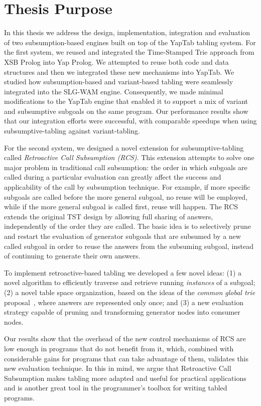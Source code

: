 \section{Thesis Purpose}

In this thesis we address the design, implementation, integration and evaluation of two subsumption-based engines
built on top of the YapTab tabling system. For the first system, we reused and integrated the Time-Stamped Trie
approach from XSB Prolog into Yap Prolog. We attempted to reuse both code and data structures and then
we integrated these new mechanisms into YapTab. We studied how subsumption-based and variant-based tabling were seamlessly
integrated into the SLG-WAM engine. Consequently, we made minimal modifications to the YapTab engine
that enabled it to support a mix of variant and subsumptive subgoals on the same program.
Our performance results show that our integration efforts were successful, with comparable
speedups when using subsumptive-tabling against variant-tabling.

For the second system, we designed a novel extension for subsumptive-tabling called
\emph{Retroactive Call Subsumption (RCS)}.
This extension attempts to solve one major problem in traditional call subsumption: the order in
which subgoals are called during a particular evaluation can greatly affect the success and applicability
of the call by subsumption technique. For example, if more specific subgoals are called before
the more general subgoal, no reuse will be employed, while if the more general subgoal is called first,
reuse will happen. The RCS extends the original TST design by allowing full sharing of answers, independently
of the order they are called. The basic idea is to selectively prune and restart the evaluation of generator
subgoals that are subsumed by a new called subgoal in order to reuse the answers from the subsuming subgoal,
instead of continuing to generate their own answers.

To implement retroactive-based tabling we developed a few novel ideas: (1) a novel algorithm to efficiently
traverse and retrieve running \emph{instances} of a subgoal; (2) a novel table space organization, based on
the ideas of the \emph{common global trie} proposal~\cite{CostaJ-08}, where answers are represented only
once; and (3) a new evaluation strategy capable of pruning and transforming generator nodes into consumer nodes.

Our results show that the overhead of the new control mechanisms of RCS are low enough in programs that do not
benefit from it, which, combined with considerable gains for programs that can take advantage of them, validates
this new evaluation technique. In this in mind, we argue that Retroactive Call Subsumption makes tabling
more adapted and useful for practical applications and is another great tool in the programmer's toolbox for
writing tabled programs.

